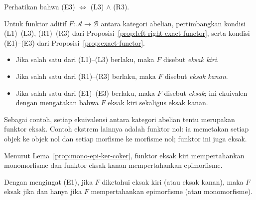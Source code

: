 Perhatikan bahwa (E3) $\iff$ (L3) $\wedge$ (R3).
\begin{definisi}\label{def:exact-functor}
Untuk funktor aditif $F:\mathcal{A}\to\mathcal{B}$ antara kategori abelian,
pertimbangkan kondisi (L1)--(L3), (R1)--(R3) dari
Proposisi~\ref{prop:left-right-exact-functor}, serta kondisi (E1)--(E3) dari
Proposisi~\ref{prop:exact-functor}.
\begin{itemize}
	\item Jika salah satu dari (L1)--(L3) berlaku, maka $F$ disebut
	\emph{eksak kiri}.
	\item Jika salah satu dari (R1)--(R3) berlaku, maka $F$ disebut
	\emph{eksak kanan}.
	\item Jika salah satu dari (E1)--(E3) berlaku, maka $F$ disebut
	\emph{eksak}; ini ekuivalen dengan mengatakan bahwa $F$ eksak kiri sekaligus
	eksak kanan.
\end{itemize}
\end{definisi}

Sebagai contoh, setiap ekuivalensi antara kategori abelian tentu merupakan
funktor eksak.
Contoh ekstrem lainnya adalah funktor nol: ia memetakan setiap objek ke objek nol
dan setiap morfisme ke morfisme nol; funktor ini juga eksak.

Menurut Lema~\ref{prop:mono-epi-ker-coker}, funktor eksak kiri mempertahankan
monomorfisme dan funktor eksak kanan mempertahankan epimorfisme.

\begin{catatan}\label{rem:exactness-mono-epi}
Dengan mengingat (E1), jika $F$ diketahui eksak kiri (atau eksak kanan), maka
$F$ eksak jika dan hanya jika $F$ mempertahankan epimorfisme (atau
monomorfisme).
\end{catatan}

